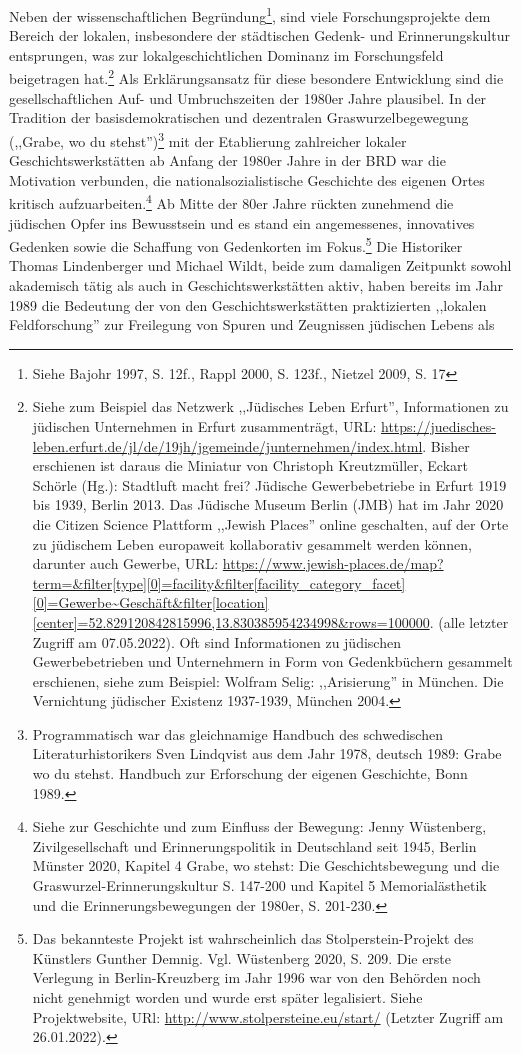 Neben der wissenschaftlichen Begründung\footnote{Siehe Bajohr 1997, S. 12f., Rappl 2000, S. 123f., Nietzel 2009, S. 17}, sind  viele Forschungsprojekte dem Bereich der lokalen, insbesondere der städtischen Gedenk- und Erinnerungskultur entsprungen, was zur lokalgeschichtlichen Dominanz im Forschungsfeld beigetragen hat.\footnote{Siehe zum Beispiel das Netzwerk ,,Jüdisches Leben Erfurt'', Informationen zu jüdischen Unternehmen in Erfurt zusammenträgt, URL: \url{https://juedisches-leben.erfurt.de/jl/de/19jh/jgemeinde/junternehmen/index.html}. Bisher erschienen ist daraus die Miniatur von Christoph Kreutzmüller, Eckart Schörle (Hg.): Stadtluft macht frei? Jüdische Gewerbebetriebe in Erfurt 1919 bis 1939, Berlin 2013. Das Jüdische Museum Berlin (JMB) hat im Jahr 2020 die Citizen Science Plattform ,,Jewish Places'' online geschalten, auf der Orte zu jüdischem Leben europaweit kollaborativ gesammelt werden können, darunter auch Gewerbe, URL: \url{https://www.jewish-places.de/map?term=&filter[type][0]=facility&filter[facility_category_facet][0]=Gewerbe~Geschäft&filter[location][center]=52.829120842815996,13.830385954234998&rows=100000}. (alle letzter Zugriff am 07.05.2022). Oft sind Informationen zu jüdischen Gewerbebetrieben und Unternehmern in Form von Gedenkbüchern gesammelt erschienen, siehe zum Beispiel: Wolfram Selig: ,,Arisierung'' in München. Die Vernichtung jüdischer Existenz 1937-1939, München 2004.} Als Erklärungsansatz für diese besondere Entwicklung sind die gesellschaftlichen Auf- und Umbruchszeiten der 1980er Jahre plausibel. In der Tradition der basisdemokratischen und dezentralen Graswurzelbegewegung (,,Grabe, wo du stehst'')\footnote{Programmatisch war das gleichnamige Handbuch des schwedischen Literaturhistorikers Sven Lindqvist aus dem Jahr 1978, deutsch 1989: Grabe wo du stehst. Handbuch zur Erforschung der eigenen Geschichte, Bonn 1989.} mit der Etablierung zahlreicher lokaler Geschichtswerkstätten ab Anfang der 1980er Jahre in der BRD war die Motivation verbunden, die nationalsozialistische Geschichte des eigenen Ortes kritisch aufzuarbeiten.\footnote{Siehe zur Geschichte und zum Einfluss der Bewegung: Jenny Wüstenberg, Zivilgesellschaft und Erinnerungspolitik in Deutschland seit 1945, Berlin Münster 2020, Kapitel 4 Grabe, wo stehst: Die Geschichtsbewegung und die Graswurzel-Erinnerungskultur S. 147-200 und Kapitel 5 Memorialästhetik und die Erinnerungsbewegungen der 1980er, S. 201-230.} Ab Mitte der 80er Jahre rückten zunehmend die jüdischen Opfer ins Bewusstsein und es stand ein angemessenes, innovatives Gedenken sowie die Schaffung von Gedenkorten im Fokus.\footnote{Das bekannteste Projekt ist wahrscheinlich das Stolperstein-Projekt des Künstlers Gunther Demnig. Vgl. Wüstenberg 2020, S. 209. Die erste Verlegung in Berlin-Kreuzberg im Jahr 1996 war von den Behörden noch nicht genehmigt worden und wurde erst später legalisiert. Siehe Projektwebsite, URl: \url{http://www.stolpersteine.eu/start/} (Letzter Zugriff am 26.01.2022).} Die Historiker Thomas Lindenberger und Michael Wildt, beide zum damaligen Zeitpunkt sowohl akademisch tätig als auch in Geschichtswerkstätten aktiv, haben bereits im Jahr 1989 die Bedeutung der von den Geschichtswerkstätten praktizierten ,,lokalen Feldforschung'' zur Freilegung von Spuren und Zeugnissen jüdischen Lebens als 